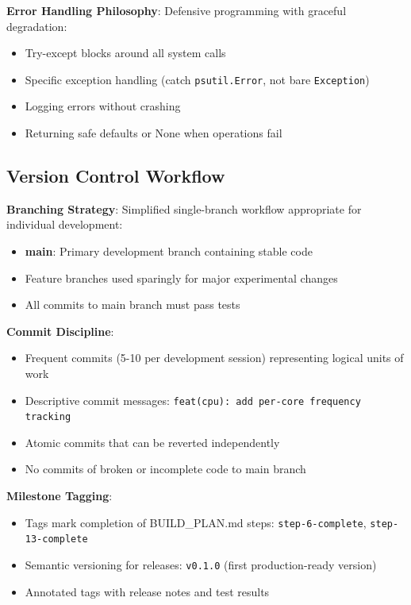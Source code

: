 \documentclass[12pt,a4paper,oneside]{report}
\begin{document}
\textbf{Error Handling Philosophy}: Defensive programming with graceful degradation:
\begin{itemize}
    \item Try-except blocks around all system calls
    \item Specific exception handling (catch \texttt{psutil.Error}, not bare \texttt{Exception})
    \item Logging errors without crashing
    \item Returning safe defaults or None when operations fail
\end{itemize}

\subsection{Version Control Workflow}

\textbf{Branching Strategy}: Simplified single-branch workflow appropriate for individual development:
\begin{itemize}
    \item \textbf{main}: Primary development branch containing stable code
    \item Feature branches used sparingly for major experimental changes
    \item All commits to main branch must pass tests
\end{itemize}

\textbf{Commit Discipline}:
\begin{itemize}
    \item Frequent commits (5-10 per development session) representing logical units of work
    \item Descriptive commit messages: \texttt{feat(cpu): add per-core frequency tracking}
    \item Atomic commits that can be reverted independently
    \item No commits of broken or incomplete code to main branch
\end{itemize}

\textbf{Milestone Tagging}:
\begin{itemize}
    \item Tags mark completion of BUILD\_PLAN.md steps: \texttt{step-6-complete}, \texttt{step-13-complete}
    \item Semantic versioning for releases: \texttt{v0.1.0} (first production-ready version)
    \item Annotated tags with release notes and test results
\end{itemize}
\end{document}
